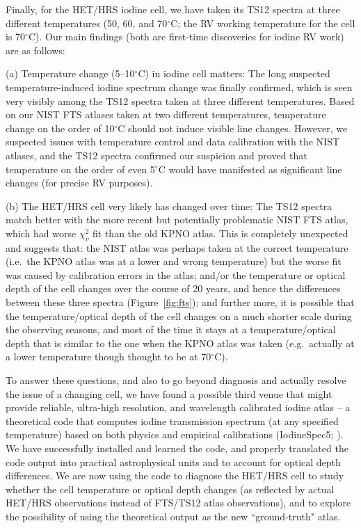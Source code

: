 \documentclass[12pt]{article}
\def\degree{^{\circ}}
\begin{document}
Finally, for the HET/HRS iodine cell, we have taken its TS12 spectra
at three different temperatures (50, 60, and 70$\degree$C; the RV
working temperature for the cell is 70$\degree$C). Our main findings
(both are first-time discoveries for iodine RV work) are as follows:

(a) Temperature change (5--10$\degree$C) in iodine cell matters: The
long suspected temperature-induced iodine spectrum change was finally
confirmed, which is seen very visibly among the TS12 spectra taken at
three different temperatures. Based on our NIST FTS atlases taken at
two different temperatures, temperature change on the order of
10$\degree$C should not induce visible line changes. However, we
suspected issues with temperature control and data calibration with
the NIST atlases, and the TS12 spectra confirmed our suspicion and
proved that temperature on the order of even 5$\degree$C would have
manifested as significant line changes (for precise RV purposes).

(b) The HET/HRS cell very likely has changed over time: The TS12
spectra match better with the more recent but potentially problematic
NIST FTS atlas, which had worse $\chi^2_\nu$ fit than the old KPNO
atlas. This is completely unexpected and suggests that: the NIST atlas
was perhaps taken at the correct temperature (i.e.\ the KPNO atlas was
at a lower and wrong temperature) but the worse fit was caused by
calibration errors in the atlas; and/or the temperature or optical
depth of the cell changes over the course of 20 years, and hence the
differences between these three spectra (Figure~\ref{fig:fts}); and
further more, it is possible that the temperature/optical depth of the
cell changes on a much shorter scale during the observing seasons, and
most of the time it stays at a temperature/optical depth that is
similar to the one when the KPNO atlas was taken (e.g.\ actually at a
lower temperature though thought to be at 70$\degree$C).

To answer these questions, and also to go beyond diagnosis and
actually resolve the issue of a changing cell, we have found a
possible third venue that might provide reliable, ultra-high
resolution, and wavelength calibrated iodine atlas -- a theoretical
code that computes iodine transmission spectrum (at any specified
temperature) based on both physics and empirical calibrations
(IodineSpec5; \citealt{iodinespec5}). We have successfully installed and
learned the code, and properly translated the code output into
practical astrophysical units and to account for optical depth
differences. We are now using the code to diagnose the HET/HRS cell to
study whether the cell temperature or optical depth changes (as
reflected by actual HET/HRS observations instead of FTS/TS12 atlas
observations), and to explore the possibility of using the theoretical
output as the new ``ground-truth" atlas.
\end{document}
